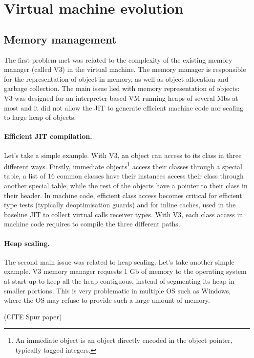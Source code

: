 \documentclass[a4paper,12pt,twoside]{../includes/ThesisStyle}
\begin{document}
\section{Virtual machine evolution}

\subsection{Memory management}

The first problem met was related to the complexity of the existing memory manager (called V3) in the virtual machine. The memory manager is responsible for the representation of object in memory, as well as object allocation and garbage collection. The main issue lied with memory representation of objects: V3 was designed for an interpreter-based VM running heaps of several Mbs at most and it did not allow the JIT to generate efficient machine code nor scaling to large heap of objects.

\paragraph{Efficient JIT compilation.} Let's take a simple example. With V3, an object can access to its class in three different ways. Firstly, immediate objects\footnote{An immediate object is an object directly encoded in the object pointer, typically tagged integers.} access their classes through a special table, a list of 16 common classes have their instances access their class through another special table, while the rest of the objects have a pointer to their class in their header. In machine code, efficient class access becomes critical for efficient type tests (typically deoptimisation guards) and for inline caches, used in the baseline JIT to collect virtual calls receiver types. With V3, each class access in machine code requires to compile the three different paths. 

\paragraph{Heap scaling.} The second main issue was related to heap scaling. Let's take another simple example. V3 memory manager requests 1 Gb of memory to the operating system at start-up to keep all the heap contiguous, instead of segmenting its heap in smaller portions. This is very problematic in multiple OS such as Windows, where the OS may refuse to provide such a large amount of memory. 

(CITE Spur paper)
\end{document}
